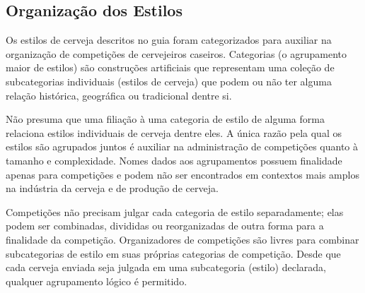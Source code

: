 \subsection*{Organização dos Estilos}

Os estilos de cerveja descritos no guia foram categorizados para auxiliar na organização de competições de cervejeiros caseiros. Categorias (o agrupamento maior de estilos) são construções artificiais que representam uma coleção de subcategorias individuais (estilos de cerveja) que podem ou não ter alguma relação histórica, geográfica ou tradicional dentre si.

Não presuma que uma filiação à uma categoria de estilo de alguma forma relaciona estilos individuais de cerveja dentre eles. A única razão pela qual os estilos são agrupados juntos é auxiliar na administração de competições quanto à tamanho e complexidade. Nomes dados aos agrupamentos possuem finalidade apenas para competições e podem não ser encontrados em contextos mais amplos na indústria da cerveja e de produção de cerveja.

Competições não precisam julgar cada categoria de estilo separadamente; elas podem ser combinadas, divididas ou reorganizadas de outra forma para a finalidade da competição. Organizadores de competições são livres para combinar subcategorias de estilo em suas próprias categorias de competição. Desde que cada cerveja enviada seja julgada em uma subcategoria (estilo) declarada, qualquer agrupamento lógico é permitido.
